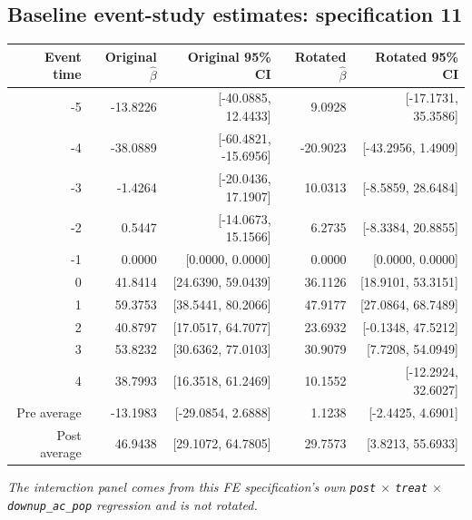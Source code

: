 \documentclass[10pt]{article}
\begin{document}
\subsection*{Baseline event-study estimates: specification 11}
\begin{center}
\scriptsize
\begin{tabular}{r rr rr}
\toprule
Event time & Original $\hat\beta$ & Original 95\% CI & Rotated $\hat\beta$ & Rotated 95\% CI \\
\midrule
-5 & -13.8226 & [-40.0885, 12.4433] & 9.0928 & [-17.1731, 35.3586] \\
-4 & -38.0889 & [-60.4821, -15.6956] & -20.9023 & [-43.2956, 1.4909] \\
-3 & -1.4264 & [-20.0436, 17.1907] & 10.0313 & [-8.5859, 28.6484] \\
-2 & 0.5447 & [-14.0673, 15.1566] & 6.2735 & [-8.3384, 20.8855] \\
-1 & 0.0000 & [0.0000, 0.0000] & 0.0000 & [0.0000, 0.0000] \\
0 & 41.8414 & [24.6390, 59.0439] & 36.1126 & [18.9101, 53.3151] \\
1 & 59.3753 & [38.5441, 80.2066] & 47.9177 & [27.0864, 68.7489] \\
2 & 40.8797 & [17.0517, 64.7077] & 23.6932 & [-0.1348, 47.5212] \\
3 & 53.8232 & [30.6362, 77.0103] & 30.9079 & [7.7208, 54.0949] \\
4 & 38.7993 & [16.3518, 61.2469] & 10.1552 & [-12.2924, 32.6027] \\
\midrule
Pre average & -13.1983 & [-29.0854, 2.6888] & 1.1238 & [-2.4425, 4.6901] \\
Post average & 46.9438 & [29.1072, 64.7805] & 29.7573 & [3.8213, 55.6933] \\
\bottomrule
\end{tabular}
\end{center}
\medskip
\textit{The interaction panel comes from this FE specification's own \texttt{post} $\times$ \texttt{treat} $\times$ \texttt{downup\_ac\_pop} regression and is not rotated.}
\clearpage
\end{document}
